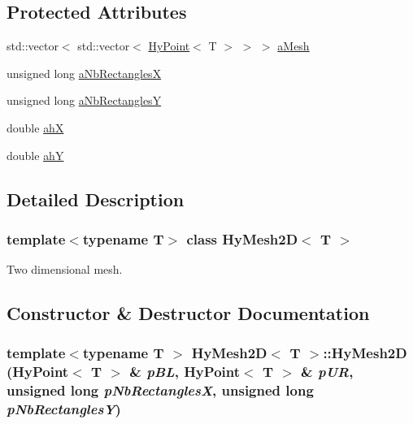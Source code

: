 \subsection*{Protected Attributes}
\begin{DoxyCompactItemize}
\item 
std::vector$<$ std::vector$<$ \hyperlink{classHyPoint}{HyPoint}$<$ T $>$ $>$ $>$ \hyperlink{classHyMesh2D_af82a94a4943d2da5637d0bbc0b405eed}{aMesh}
\item 
unsigned long \hyperlink{classHyMesh2D_a53430a7d9168ad8e9392252b87e139eb}{aNbRectanglesX}
\item 
unsigned long \hyperlink{classHyMesh2D_a836a8033b37ffdb7103510eabb1b3055}{aNbRectanglesY}
\item 
double \hyperlink{classHyMesh2D_a613e4597dc45ca5629ec46eb941e9db8}{ahX}
\item 
double \hyperlink{classHyMesh2D_a90e7b6ebe92fca8ad22795899ec8500b}{ahY}
\end{DoxyCompactItemize}


\subsection{Detailed Description}
\subsubsection*{template$<$typename T$>$ class HyMesh2D$<$ T $>$}

Two dimensional mesh. 

\subsection{Constructor \& Destructor Documentation}
\hypertarget{classHyMesh2D_a0b73e736d5f0a2fc253d4ef724968b1f}{
\subsubsection[{HyMesh2D}]{\setlength{\rightskip}{0pt plus 5cm}template$<$typename T $>$ {\bf HyMesh2D}$<$ T $>$::{\bf HyMesh2D} ({\bf HyPoint}$<$ T $>$ \& {\em pBL}, \/  {\bf HyPoint}$<$ T $>$ \& {\em pUR}, \/  unsigned long {\em pNbRectanglesX}, \/  unsigned long {\em pNbRectanglesY})}}
\label{classHyMesh2D_a0b73e736d5f0a2fc253d4ef724968b1f}


